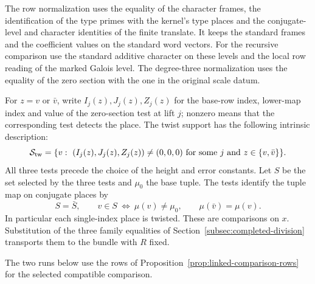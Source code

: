 The row normalization uses the equality of the character
frames, the identification of the type primes with the
kernel's type places and the conjugate-level and character
identities of the finite translate. It keeps the standard
frames and the coefficient values on the standard word
vectors. For the recursive comparison use the standard
additive character on these levels and the local row
reading of the marked Galois level. The degree-three
normalization uses the equality of the zero section with
the one in the original scale datum.

For \(z=v\) or \(\bar v\), write \(I_j(z),J_j(z),Z_j(z)\) for the
base-row index, lower-map index and value of the zero-section test at lift \(j\);
nonzero means that the corresponding test detects the place. The twist
support has the following intrinsic description:
\[
 \mathcal S_{\rm tw}
 =\{v:\ (I_j(z),J_j(z),Z_j(z))\ne(0,0,0)
            \text{ for some }j\text{ and }z\in\{v,\bar v\}\}.
\]
All three tests precede the choice of the height and error constants.
Let \(S\) be the set selected by the three tests and \(\mu_0\) the base tuple. The tests identify the tuple map on conjugate places by
\[
 S=\bar S,\qquad v\in S\ \Longleftrightarrow\ \mu(v)\ne\mu_0,\qquad \mu(\bar v)=\mu(v).
\] In particular each
single-index place is twisted.
These are comparisons on \(x\). Substitution of the three
family equalities of Section~\ref{subsec:completed-division}
transports them to the bundle with \(R\) fixed.
\label{cor:completed-division-6}



The two runs below use the rows of Proposition~\ref{prop:linked-comparison-rows}
for the selected compatible comparison.

